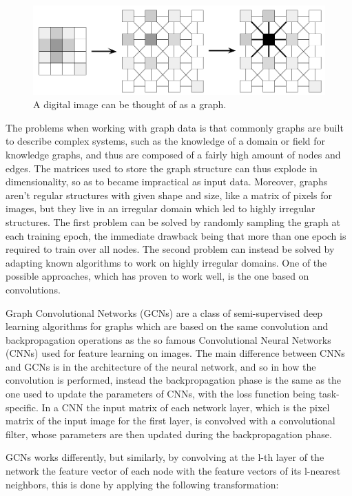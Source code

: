 \documentclass[%
    corpo=13.5pt,
    twoside,
    oldstyle,
    tipotesi=magistrale,
    greek,
    evenboxes
]{toptesi}
\begin{document}
\begin{figure}[h]
    \centering
    \includegraphics[scale=0.4]{img/pixels-as-graph.png}
    \caption{A digital image can be thought of as a graph.}
    \label{fig:pixels-as-graph}
\end{figure}

The problems when working with graph data is that commonly graphs
are built to describe complex systems, such as the knowledge of a
domain or field for knowledge graphs, and thus are composed of
a fairly high amount of nodes and edges. The matrices used to
store the graph structure can thus explode in dimensionality, so as
to became impractical as input data. Moreover, graphs aren't
regular structures with given shape and size, like a matrix of pixels
for images, but they live in an irregular domain which led to highly
irregular structures.
The first problem can be solved by randomly sampling the graph at each
training epoch, the immediate drawback being that more than one epoch
is required to train over all nodes. The second problem can instead be
solved by adapting known algorithms to work on highly irregular domains.
One of the possible approaches, which has proven to work well, is
the one based on convolutions.

Graph Convolutional Networks (GCNs) \cite{kipf2016} are a class of
semi-supervised deep learning algorithms for graphs which are based on the
same convolution and backpropagation operations as the so famous
Convolutional Neural Networks (CNNs) used for feature learning on
images.
The main difference between CNNs and GCNs is in the architecture of
the neural network, and so in how the convolution is performed, instead
the backpropagation phase is the same as the one used to update the
parameters of CNNs, with the loss function being task-specific.
In a CNN the input matrix of each network layer, which is the pixel matrix
of the input image for the first layer, is convolved with a convolutional
filter, whose parameters are then updated during the backpropagation phase.

GCNs works differently, but similarly, by convolving at the l-th layer
of the network the feature vector of each node with the feature
vectors of its l-nearest neighbors, this is done by applying the following
transformation:
\end{document}
